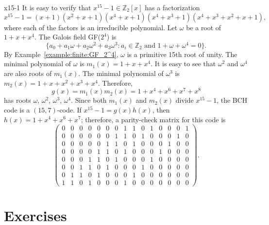 \begin{example}{x15-1}
It is easy to verify that $x^{15} - 1 \in {\mathbb Z}_2[x]$ has a
factorization
\[
x^{15} - 1 = (x + 1)(x^2 + x + 1)(x^4 + x + 1)(x^4 + x^3 + 1)(x^4 +
x^3 + x^2 + x + 1),
\]
where each of the factors is an irreducible polynomial.
Let $\omega$ be a root of $1 + x + x^4$. The Galois field GF($2^4$) is
\[
\{
a_0 + a_1 \omega + a_2 \omega^2 + a_3 \omega^3 : a_i \in {\mathbb Z}_2
\mbox{ and } 1 + \omega + \omega^4 = 0
\}.
\]
By Example~\ref{example:finite:GF_2^4}, $\omega$ is a primitive 15th root of unity. The
minimal polynomial of $\omega$ is $m_1(x) = 1 + x + x^4$. It is easy
to see that $\omega^2$ and $\omega^4$ are also roots of $m_1(x)$. The
minimal polynomial of $\omega^3$ is $m_2(x) = 1 + x + x^2 + x^3 +
x^4$. Therefore, 
\[
g(x) = m_1(x) m_2(x) = 1 + x^4 + x^6 + x^7 + x^8
\]
has roots $\omega$, $\omega^2$, $\omega^3$, $\omega^4$.  Since both $m_1(x)$
and $m_2(x)$ divide $x^{15} - 1$, the BCH code is a $(15, 7)$-code. If
$x^{15} -1 = g(x)h(x)$, then $h(x) = 1 + x^4 + x^6 + x^7$; therefore,
a parity-check matrix for this code is
\[
\left( %
\begin{array}{ccccccccccccccc}
0 & 0 & 0 & 0 & 0 & 0 & 0 & 1 & 1 & 0 & 1 & 0 & 0 & 0 & 1 \\
0 & 0 & 0 & 0 & 0 & 0 & 1 & 1 & 0 & 1 & 0 & 0 & 0 & 1 & 0 \\
0 & 0 & 0 & 0 & 0 & 1 & 1 & 0 & 1 & 0 & 0 & 0 & 1 & 0 & 0 \\
0 & 0 & 0 & 0 & 1 & 1 & 0 & 1 & 0 & 0 & 0 & 1 & 0 & 0 & 0 \\
0 & 0 & 0 & 1 & 1 & 0 & 1 & 0 & 0 & 0 & 1 & 0 & 0 & 0 & 0 \\
0 & 0 & 1 & 1 & 0 & 1 & 0 & 0 & 0 & 1 & 0 & 0 & 0 & 0 & 0 \\
0 & 1 & 1 & 0 & 1 & 0 & 0 & 0 & 1 & 0 & 0 & 0 & 0 & 0 & 0 \\
1 & 1 & 0 & 1 & 0 & 0 & 0 & 1 & 0 & 0 & 0 & 0 & 0 & 0 & 0
\end{array}
\right).
\]
\end{example}


 
\section*{Exercises}
\exrule

